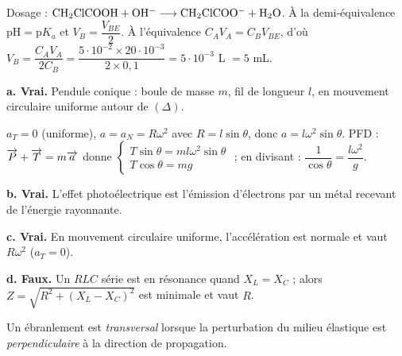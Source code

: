 \documentclass[11pt]{article}
\begin{document}
 Dosage : $\mathrm{CH_2ClCOOH + OH^- \longrightarrow CH_2ClCOO^- + H_2O}$. À la demi-équivalence $\text{pH} = \text{p}K_a$ et $V_B = \dfrac{V_{BE}}{2}$. À l'équivalence $C_A V_A = C_B V_{BE}$, d'où $V_B = \dfrac{C_A V_A}{2C_B} = \dfrac{5\cdot10^{-2}\times 20\cdot10^{-3}}{2\times 0{,}1} = 5\cdot10^{-3}$ L $= 5$ mL.


\textbf{a. Vrai.} Pendule conique : boule de masse $m$, fil de longueur $l$, en mouvement circulaire uniforme autour de $(\Delta)$.
\begin{center}
\end{center}
$a_T = 0$ (uniforme), $a = a_N = R\omega^2$ avec $R = l\sin\theta$, donc $a = l\omega^2\sin\theta$. PFD : $\overrightarrow{P} + \overrightarrow{T} = m\overrightarrow{a}$ donne $\begin{cases} T\sin\theta = ml\omega^2\sin\theta \\ T\cos\theta = mg \end{cases}$ ; en divisant : $\dfrac{1}{\cos\theta} = \dfrac{l\omega^2}{g}$.

\textbf{b. Vrai.} L'effet photoélectrique est l'émission d'électrons par un métal recevant de l'énergie rayonnante.

\textbf{c. Vrai.} En mouvement circulaire uniforme, l'accélération est normale et vaut $R\omega^2$ ($a_T = 0$).

\textbf{d. Faux.} Un $RLC$ série est en résonance quand $X_L = X_C$ ; alors $Z = \sqrt{R^2 + (X_L - X_C)^2}$ est minimale et vaut $R$.

Un ébranlement est \emph{transversal} lorsque la perturbation du milieu élastique est \emph{perpendiculaire} à la direction de propagation.
\end{document}

